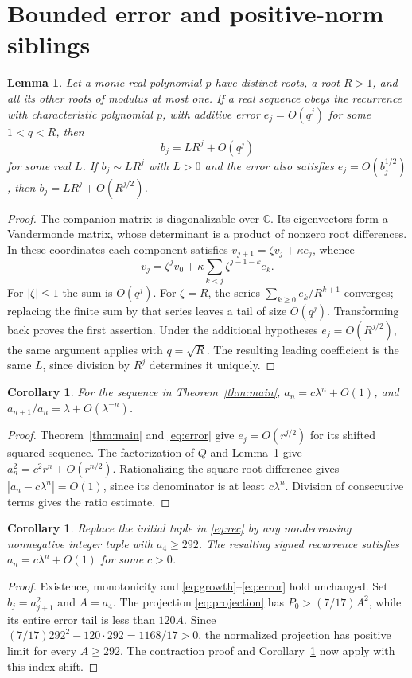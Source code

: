 \documentclass[11pt]{article}
\newtheorem{corollary}[theorem]{Corollary}
\newtheorem{lemma}[theorem]{Lemma}
\begin{document}
\section{Bounded error and positive-norm siblings}
\begin{lemma}\label{lem:forcing}
Let a monic real polynomial $p$ have distinct roots, a root $R>1$,
and all its other roots of modulus at most one. If a real sequence
obeys the recurrence with characteristic polynomial $p$, with additive
error $e_j=O(q^j)$ for some $1<q<R$, then
\[
 b_j=L R^j+O(q^j)
\]
for some real $L$. If $b_j\sim L R^j$ with $L>0$ and the error also
satisfies $e_j=O(b_j^{1/2})$, then
$b_j=L R^j+O(R^{j/2})$.
\end{lemma}
\begin{proof}
The companion matrix is diagonalizable over $\mathbb C$.
Its eigenvectors form a Vandermonde matrix, whose determinant is a
product of nonzero root differences. In these coordinates each
component satisfies $v_{j+1}=\zeta v_j+\kappa e_j$, whence
\[
 v_j=\zeta^jv_0+\kappa\sum_{k<j}\zeta^{j-1-k}e_k.
\]
For $|\zeta|\le1$ the sum is $O(q^j)$. For $\zeta=R$, the series
$\sum_{k\ge0}e_k/R^{k+1}$ converges; replacing the finite sum by that
series leaves a tail of size $O(q^j)$. Transforming back proves the
first assertion. Under the additional hypotheses $e_j=O(R^{j/2})$,
the same argument applies with $q=\sqrt R$. The resulting leading
coefficient is the same $L$, since division by $R^j$ determines it
uniquely.
\end{proof}

\begin{corollary}\label{cor:bounded}
For the sequence in Theorem~\ref{thm:main},
$a_n=c\lambda^n+O(1)$, and
$a_{n+1}/a_n=\lambda+O(\lambda^{-n})$.
\end{corollary}
\begin{proof}
Theorem~\ref{thm:main} and \eqref{eq:error} give
$e_j=O(r^{j/2})$ for its shifted squared sequence.
The factorization of $Q$ and Lemma~\ref{lem:forcing} give
$a_n^2=c^2r^n+O(r^{n/2})$. Rationalizing the square-root difference
gives $|a_n-c\lambda^n|=O(1)$, since its denominator is at least
$c\lambda^n$. Division of consecutive terms gives the ratio estimate.
\end{proof}

\begin{corollary}\label{cor:large}
Replace the initial tuple in \eqref{eq:rec} by any nondecreasing
nonnegative integer tuple with $a_4\ge292$. The resulting signed
recurrence satisfies $a_n=c\lambda^n+O(1)$ for some $c>0$.
\end{corollary}
\begin{proof}
Existence, monotonicity and \eqref{eq:growth}--\eqref{eq:error} hold
unchanged. Set $b_j=a_{j+1}^2$ and $A=a_4$. The projection
\eqref{eq:projection} has $P_0>(7/17)A^2$, while its entire error
tail is less than $120A$. Since
$(7/17)292^2-120\cdot292=1168/17>0$, the normalized projection has
positive limit for every $A\ge292$. The contraction proof and
Corollary~\ref{cor:bounded} now apply with this index shift.
\end{proof}
\end{document}
